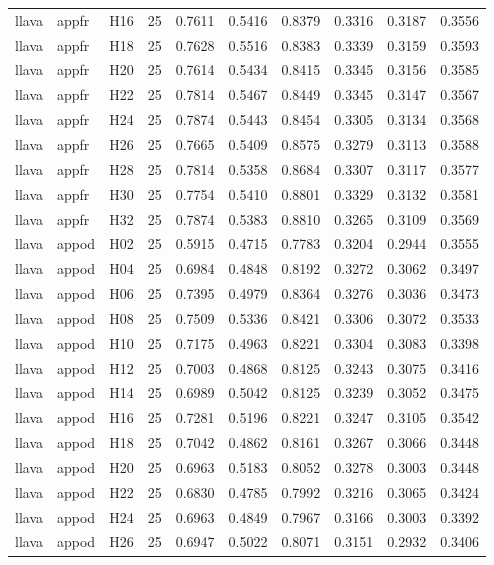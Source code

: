 \begin{table}[tbp]
\begin{tabular}{lllrrrrrrr}
llava & appfr & H16 & 25 & 0.7611 & 0.5416 & 0.8379 & 0.3316 & 0.3187 & 0.3556 \\
llava & appfr & H18 & 25 & 0.7628 & 0.5516 & 0.8383 & 0.3339 & 0.3159 & 0.3593 \\
llava & appfr & H20 & 25 & 0.7614 & 0.5434 & 0.8415 & 0.3345 & 0.3156 & 0.3585 \\
llava & appfr & H22 & 25 & 0.7814 & 0.5467 & 0.8449 & 0.3345 & 0.3147 & 0.3567 \\
llava & appfr & H24 & 25 & 0.7874 & 0.5443 & 0.8454 & 0.3305 & 0.3134 & 0.3568 \\
llava & appfr & H26 & 25 & 0.7665 & 0.5409 & 0.8575 & 0.3279 & 0.3113 & 0.3588 \\
llava & appfr & H28 & 25 & 0.7814 & 0.5358 & 0.8684 & 0.3307 & 0.3117 & 0.3577 \\
llava & appfr & H30 & 25 & 0.7754 & 0.5410 & 0.8801 & 0.3329 & 0.3132 & 0.3581 \\
llava & appfr & H32 & 25 & 0.7874 & 0.5383 & 0.8810 & 0.3265 & 0.3109 & 0.3569 \\
llava & appod & H02 & 25 & 0.5915 & 0.4715 & 0.7783 & 0.3204 & 0.2944 & 0.3555 \\
llava & appod & H04 & 25 & 0.6984 & 0.4848 & 0.8192 & 0.3272 & 0.3062 & 0.3497 \\
llava & appod & H06 & 25 & 0.7395 & 0.4979 & 0.8364 & 0.3276 & 0.3036 & 0.3473 \\
llava & appod & H08 & 25 & 0.7509 & 0.5336 & 0.8421 & 0.3306 & 0.3072 & 0.3533 \\
llava & appod & H10 & 25 & 0.7175 & 0.4963 & 0.8221 & 0.3304 & 0.3083 & 0.3398 \\
llava & appod & H12 & 25 & 0.7003 & 0.4868 & 0.8125 & 0.3243 & 0.3075 & 0.3416 \\
llava & appod & H14 & 25 & 0.6989 & 0.5042 & 0.8125 & 0.3239 & 0.3052 & 0.3475 \\
llava & appod & H16 & 25 & 0.7281 & 0.5196 & 0.8221 & 0.3247 & 0.3105 & 0.3542 \\
llava & appod & H18 & 25 & 0.7042 & 0.4862 & 0.8161 & 0.3267 & 0.3066 & 0.3448 \\
llava & appod & H20 & 25 & 0.6963 & 0.5183 & 0.8052 & 0.3278 & 0.3003 & 0.3448 \\
llava & appod & H22 & 25 & 0.6830 & 0.4785 & 0.7992 & 0.3216 & 0.3065 & 0.3424 \\
llava & appod & H24 & 25 & 0.6963 & 0.4849 & 0.7967 & 0.3166 & 0.3003 & 0.3392 \\
llava & appod & H26 & 25 & 0.6947 & 0.5022 & 0.8071 & 0.3151 & 0.2932 & 0.3406 \\

\end{tabular}
\end{table}
